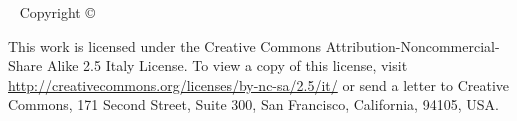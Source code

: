 %
%
%
%
\newpage
\begin{fullwidth}
~\vfill
\thispagestyle{empty}
\setlength{\parindent}{0pt}
\setlength{\parskip}{\baselineskip}
Copyright \copyright\ \the\year\ \thanklessauthor

\par{}

\par This work is licensed under the Creative Commons Attribution-Noncommercial-Share Alike 2.5 Italy License. To view a copy of this license, visit \url{http://creativecommons.org/licenses/by-nc-sa/2.5/it/} or send a letter to Creative Commons, 171 Second Street, Suite 300, San Francisco, California, 94105, USA.

\end{fullwidth}